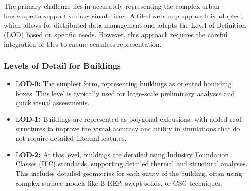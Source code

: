 \documentclass[runningheads]{llncs}
\begin{document}
The primary challenge lies in accurately representing the complex urban landscape to support various simulations. A tiled web map approach is adopted, which allows for distributed data management and adapts the Level of Definition (LOD) based on specific needs. However, this approach requires the careful integration of tiles to ensure seamless representation.

\subsubsection{Levels of Detail for Buildings}
\begin{itemize}
    \item \textbf{LOD-0:} The simplest form, representing buildings as oriented bounding boxes. This level is typically used for large-scale preliminary analyses and quick visual assessments.
    \item \textbf{LOD-1:} Buildings are represented as polygonal extrusions, with added roof structures to improve the visual accuracy and utility in simulations that do not require detailed internal features.
    \item \textbf{LOD-2:} At this level, buildings are detailed using Industry Foundation Classes (IFC) standards, supporting detailed thermal and structural analyses. This includes detailed geometries for each entity of the building, often using complex surface models like B-REP, swept solids, or CSG techniques.
\end{itemize}
\end{document}
